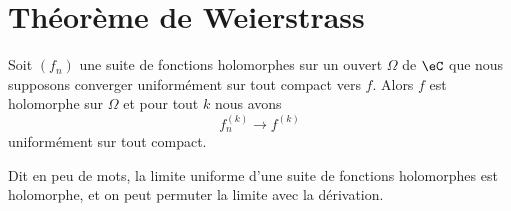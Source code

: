 \section{Théorème de Weierstrass}

\begin{theorem}       \label{ThoArYtQO}
    Soit \( (f_n)\) une suite de fonctions holomorphes sur un ouvert \( \Omega\) de \( \eC\) que nous supposons converger uniformément sur tout compact vers \( f\). Alors \( f\) est holomorphe sur \( \Omega\) et pour tout \( k\) nous avons
    \begin{equation}
        f^{(k)}_n\to f^{(k)}
    \end{equation}
    uniformément sur tout compact.

    Dit en peu de mots, la limite uniforme d'une suite de fonctions holomorphes est holomorphe, et on peut permuter la limite avec la dérivation.
\end{theorem}

